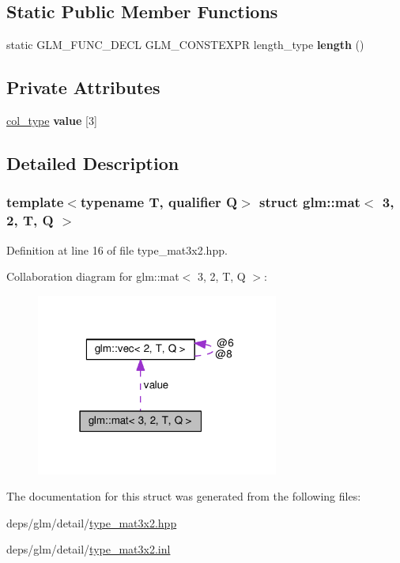 \subsection*{Static Public Member Functions}
\begin{DoxyCompactItemize}
\item 
\mbox{\label{structglm_1_1mat_3_013_00_012_00_01T_00_01Q_01_4_a0749f456a66fa818e3d8aa4db3eaea3b}} 
static G\+L\+M\+\_\+\+F\+U\+N\+C\+\_\+\+D\+E\+CL G\+L\+M\+\_\+\+C\+O\+N\+S\+T\+E\+X\+PR length\+\_\+type {\bfseries length} ()
\end{DoxyCompactItemize}
\subsection*{Private Attributes}
\begin{DoxyCompactItemize}
\item 
\mbox{\label{structglm_1_1mat_3_013_00_012_00_01T_00_01Q_01_4_a49358f69d92f2817e5ee764a5ae2cc8f}} 
\hyperlink{structglm_1_1vec_3_012_00_01T_00_01Q_01_4}{col\+\_\+type} {\bfseries value} \mbox{[}3\mbox{]}
\end{DoxyCompactItemize}


\subsection{Detailed Description}
\subsubsection*{template$<$typename T, qualifier Q$>$\newline
struct glm\+::mat$<$ 3, 2, T, Q $>$}



Definition at line 16 of file type\+\_\+mat3x2.\+hpp.



Collaboration diagram for glm\+:\+:mat$<$ 3, 2, T, Q $>$\+:
\nopagebreak
\begin{figure}[H]
\begin{center}
\leavevmode
\includegraphics[width=226pt]{d9/d86/structglm_1_1mat_3_013_00_012_00_01T_00_01Q_01_4__coll__graph}
\end{center}
\end{figure}


The documentation for this struct was generated from the following files\+:\begin{DoxyCompactItemize}
\item 
deps/glm/detail/\hyperlink{type__mat3x2_8hpp}{type\+\_\+mat3x2.\+hpp}\item 
deps/glm/detail/\hyperlink{type__mat3x2_8inl}{type\+\_\+mat3x2.\+inl}\end{DoxyCompactItemize}
